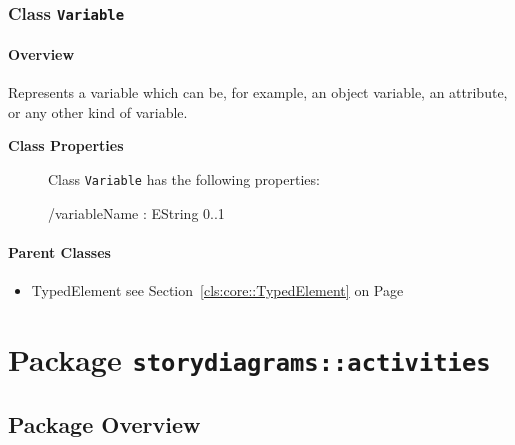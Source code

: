 \subsubsection{\Large{Class \bfseries \texttt{Variable}\normalfont}}
\label{cls:storydiagrams::Variable} 
\paragraph{Overview}

	
			
Represents a variable which can be, for example, an object variable, an attribute, or any other kind of variable.	
		
	


\begin{description}

	\item[\textbf{Class Properties}] Class \texttt{Variable} has the following properties:
	\begin{description}
\item[/variableName : EString 			0..1]

\hspace{\fill}
\nopagebreak


	
	\end{description}
	
	

\end{description}

\paragraph{Parent Classes}
\begin{itemize}
\item TypedElement see Section~\ref{cls:core::TypedElement} on Page~\pageref{cls:core::TypedElement}\end{itemize}
\newpage
		


\section{Package \bfseries \texttt{storydiagrams::activities}\normalfont}
\subsection{Package Overview}
	
